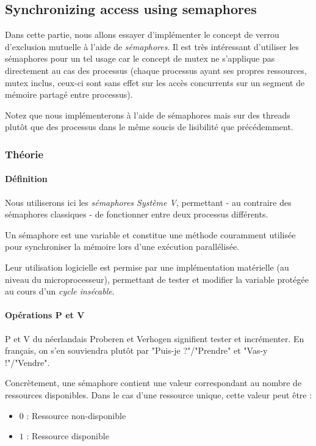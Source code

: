 \documentclass[a4paper, 12pt]{article}
\begin{document}
\subsection{Synchronizing access using semaphores}

Dans cette partie, nous allons essayer d'implémenter le concept de verrou d'exclusion mutuelle à l'aide de \emph{sémaphores}. Il est très intéressant d'utiliser les sémaphores pour un tel usage car le concept de mutex ne s'applique pas directement au cas des processus (chaque processus ayant ses propres ressources, mutex inclus, ceux-ci sont sans effet sur les accès concurrents sur un segment de mémoire partagé entre processus).

Notez que nous implémenterons à l'aide de sémaphores mais sur des threads plutôt que des processus dans le même soucis de lisibilité que précédemment.

\subsubsection{Théorie}

\paragraph{Définition\\}

Nous utiliserons ici les \emph{sémaphores Système V}, permettant - au contraire des sémaphores classiques - de fonctionner entre deux processus différents.

Un sémaphore est une variable et constitue une méthode couramment utilisée pour synchroniser la mémoire lors d'une exécution parallélisée. 

Leur utilisation logicielle est permise par une implémentation matérielle (au niveau du microprocesseur), permettant de tester et modifier la variable protégée au cours d'un \emph{cycle insécable}.

\paragraph{Opérations P et V\\}

P et V du néerlandais Proberen et Verhogen signifient tester et incrémenter. En français, on s'en souviendra plutôt par "Puis-je ?"/"Prendre" et "Vas-y !"/"Vendre".

Concrètement, une sémaphore contient une valeur correspondant au nombre de ressources disponibles. Dans le cas d'une ressource unique, cette valeur peut être :
\begin{itemize}
    \item[\textbullet] $0$ : Ressource non-disponible
    \item[\textbullet] $1$ : Ressource disponible
\end{itemize}
\end{document}
